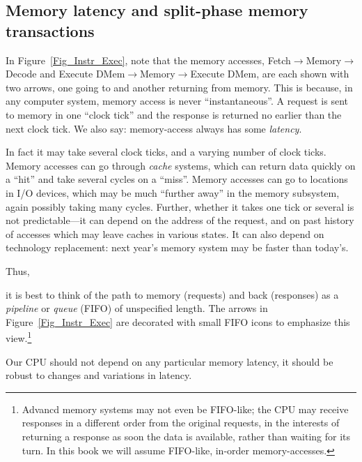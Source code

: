 
\subsection{Memory latency and split-phase memory transactions}

\label{Sec_mem_latency}


In Figure~\ref{Fig_Instr_Exec}, note that the memory accesses,
Fetch$\longrightarrow$Memory$\longrightarrow$Decode and Execute
DMem$\longrightarrow$Memory$\longrightarrow$Execute DMem, are each
shown with two arrows, one going to and another returning from memory.
This is because, in any computer system, memory access is never
``instantaneous''.  A request is sent to memory in one ``clock tick''
and the response is returned no earlier than the next clock tick.  We
also say: memory-access always has some \emph{latency}.

In fact it may take several clock ticks, and a varying number of clock
ticks.  Memory accesses can go through \emph{cache} systems, which can
return data quickly on a ``hit'' and take several cycles on a
``miss''.  Memory accesses can go to locations in I/O devices, which
may be much ``further away'' in the memory subsystem, again possibly
taking many cycles.  Further, whether it takes one tick or several is
not predictable---it can depend on the address of the request, and on
past history of accesses which may leave caches in various states.  It
can also depend on technology replacement: next year's memory system
may be faster than today's.

Thus,

\begin{tightlist}

 \item it is best to think of the path to memory (requests) and back
       (responses) as a \emph{pipeline} or \emph{queue} (FIFO) of
       unspecified length.  The arrows in Figure~\ref{Fig_Instr_Exec}
       are decorated with small FIFO icons to emphasize this
       view.\footnote{Advancd memory systems may not even be
       FIFO-like; the CPU may receive responses in a different order
       from the original requests, in the interests of returning a
       response as soon the data is available, rather than waiting for
       its turn.  In this book we will assume FIFO-like, in-order
       memory-accesses.}

 \item Our CPU should not depend on any particular memory latency,
       {\ie} it should be robust to changes and variations in latency.

\end{tightlist}

